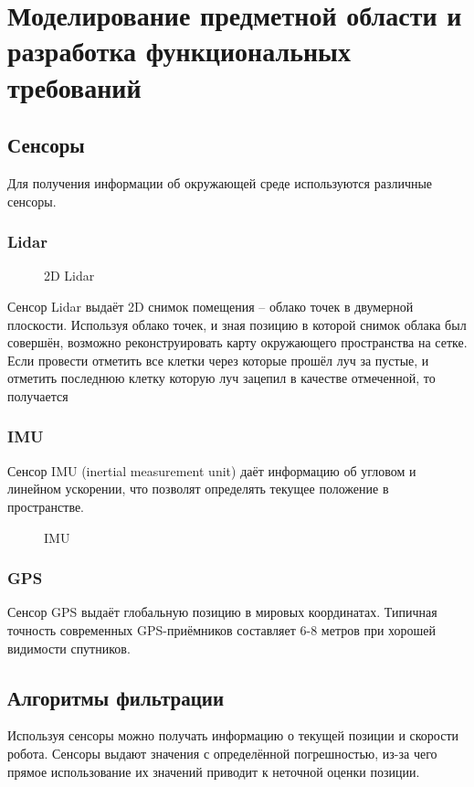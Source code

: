 \section{Моделирование предметной области и разработка функциональных
требований}

{
\renewcommand{\mathbf}[1]{#1}
\subsection{Сенсоры}

Для получения информации об окружающей среде используются различные сенсоры.

\subsubsection{Lidar}

\begin{figure}[h]
\centering
\caption{2D Lidar}
\end{figure}

Сенсор Lidar выдаёт 2D снимок помещения -- облако точек в двумерной плоскости.
Используя облако точек, и зная позицию в которой снимок облака был совершён,
возможно реконструировать карту окружающего пространства на сетке. Если провести
отметить все клетки через которые прошёл луч за пустые, и отметить последнюю
клетку которую луч зацепил в качестве отмеченной, то получается 

\subsubsection{IMU}
Сенсор IMU (inertial measurement unit) даёт информацию об угловом и линейном
ускорении, что позволят определять текущее положение в пространстве.

\begin{figure}[h]
\centering
\caption{IMU}
\end{figure}

\subsubsection{GPS}
Сенсор GPS выдаёт глобальную позицию в мировых координатах. Типичная точность
современных GPS-приёмников составляет 6-8 метров при хорошей видимости
спутников. 

\subsection{Алгоритмы фильтрации}
Используя сенсоры можно получать информацию о текущей позиции и скорости робота.
Сенсоры выдают значения с определённой погрешностью, из-за чего прямое
использование их значений приводит к неточной оценки позиции.

}
